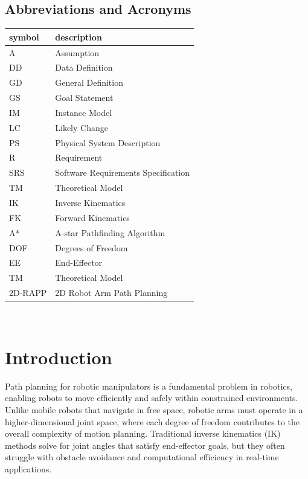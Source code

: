 \documentclass[12pt]{article}
\begin{document}
\subsection{Abbreviations and Acronyms}

\renewcommand{\arraystretch}{1.2}
\begin{tabular}{l l} 
  \toprule		
  \textbf{symbol} & \textbf{description}\\
  \midrule 
  A & Assumption\\
  DD & Data Definition\\
  GD & General Definition\\
  GS & Goal Statement\\
  IM & Instance Model\\
  LC & Likely Change\\
  PS & Physical System Description\\
  R & Requirement\\
  SRS & Software Requirements Specification\\
  TM & Theoretical Model\\
  IK & Inverse Kinematics \\
  FK & Forward Kinematics \\
  A* & A-star Pathfinding Algorithm \\
  DOF & Degrees of Freedom \\
  EE & End-Effector \\
  TM & Theoretical Model\\
  2D-RAPP & 2D Robot Arm Path Planning\\
  \bottomrule
\end{tabular}\\





\section{Introduction}
Path planning for robotic manipulators is a fundamental problem in robotics, enabling robots to move efficiently and safely within constrained environments. Unlike mobile robots that navigate in free space, robotic arms must operate in a higher-dimensional joint space, where each degree of freedom contributes to the overall complexity of motion planning. Traditional inverse kinematics (IK) methods solve for joint angles that satisfy end-effector goals, but they often struggle with obstacle avoidance and computational efficiency in real-time applications.
\end{document}
